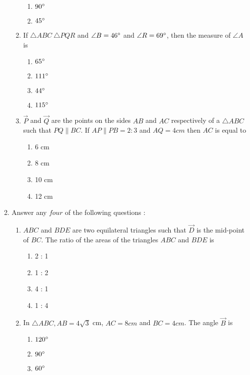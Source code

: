 \begin{enumerate}
\begin{enumerate}
\begin{enumerate}
		\item $ 90{\degree} $
		\item $ 45{\degree} $
			\end{enumerate}
		\item If $ \triangle ABC ~ \triangle PQR $ and $ \angle{B} =46{\degree} $ and $ \angle{R} = 
			69{\degree} $, then the measure of $ \angle{A} $ is
				\begin{enumerate}
					\item $ 65{\degree} $
					\item $ 111{\degree} $
					\item $ 44{\degree} $
					\item $ 115{\degree} $
				\end{enumerate}
			\item $ \vec{P} $ and $ \vec{Q} $ are the points on the sides $ AB $ and $ AC $ 
				respectively of a 
				$ \triangle ABC $ such that $ PQ \parallel BC $. If 
				$ AP \parallel PB = 2 : 3 $ and $ AQ = 4 cm $ then $ AC $ is equal to
				\begin{enumerate}
					\item 6 cm 
					\item 8 cm
					\item 10 cm
					\item 12 cm
				\end{enumerate}
		\end{enumerate}
	\item Answer any $ four $ of the following questions :
		\begin{enumerate}
			\item $ ABC $ and $ BDE $ are two equilateral triangles such that $ \vec{D} $ 
				is the mid-point of $ BC $. The ratio of the areas of the triangles 
				$ ABC $ and $ BDE $ is
				\begin{enumerate}
					\item 2 : 1
					\item 1 : 2
					\item 4 : 1
					\item 1 : 4
				\end{enumerate}
			\item In $ \triangle ABC, AB = 4 \sqrt{3} $ cm, $ AC = 8 cm $ and $ BC = 4 cm $. 
				The angle $ \vec{B} $ is
				\begin{enumerate}
					\item $ 120{\degree} $
					\item $ 90{\degree} $
					\item $ 60{\degree} $

\end{enumerate}
\end{enumerate}
\end{enumerate}
